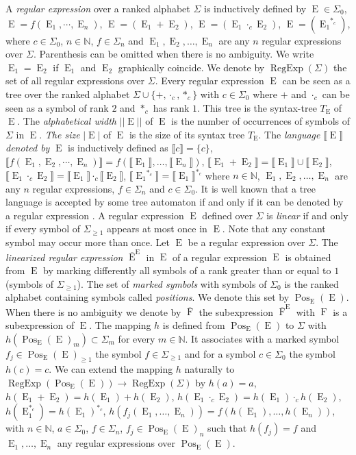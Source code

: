 \documentclass{llncs}
\def\Po#1#2{\Pos_{#1}{(#2)}}
\def\regw#1{\Reg{(#1)}}
\DeclareMathOperator{\Reg}{RegExp}
\DeclareMathOperator{\E}{E}
\DeclareMathOperator{\f}{F}
\DeclareMathOperator{\Pos}{Pos}
\def\b#1{\overline{#1}}
\begin{document}
A \emph{regular expression} over a ranked alphabet $\Sigma$ is inductively defined by $\E\in \Sigma_0$, $\E=f(\E_1, \cdots, \E_n)$, $\E=(\E_1+\E_2)$, $\E=(\E_1\cdot_c \E_2)$, $\E=({\E_1}^{*_c})$, where $c\in\Sigma_0$, $n\in\mathbb{N}$, $f\in\Sigma_n$ and $\E_1,\E_2 ,\dots, \E_n$ are any $n$ regular expressions over $\Sigma$. Parenthesis can be omitted when there is no ambiguity. We write $\E_1=\E_2$ if $\E_1$ and $\E_2$ graphically coincide. We denote by $\regw{\Sigma}$ the set of all regular expressions over $\Sigma$. Every regular expression $\E$ can be seen as a tree over the ranked alphabet $\Sigma\cup \{+,\cdot_c, *_c \}$ with $c\in \Sigma_0$ where $+$ and $\cdot_c$ can be seen as a symbol of rank $2$ and $*_c$ has rank $1$. This tree is the syntax-tree $T_{\E}$ of $\E$. The \emph{alphabetical width} $||\E||$ of $\E$ is the number of occurrences of symbols of $\Sigma$ in $\E$. \emph{The size} $|\E|$ of $\E$ is the size of its syntax tree $T_{\E}$. The \emph{language} $\llbracket \E\rrbracket$  \emph{
denoted by} $\E$ is inductively defined as $\llbracket c\rrbracket=\lbrace c\rbrace$, $\llbracket f(\E_1,\E_2 , \cdots, \E_n)\rrbracket= f(\llbracket \E_1 \rrbracket, \dots, \llbracket \E_n \rrbracket)$, $\llbracket \E_1+ \E_2\rrbracket=\llbracket \E_1\rrbracket\cup\llbracket \E_2 \rrbracket$, $\llbracket \E_1\cdot_{c} \E_2\rrbracket=\llbracket \E_1\rrbracket \cdot_{c}\llbracket \E_2 \rrbracket$, $\llbracket {\E_1}^{*_c}\rrbracket=\llbracket \E_1\rrbracket^{*_c}$ where  $n\in\mathbb{N}$, $\E_1,\E_2,\dots, \E_n$ are any $n$ regular expressions, $f\in\Sigma_n$  and $c\in \Sigma_0$. It is well known that a tree language  is accepted by some tree automaton if and only if it can be denoted by a regular expression \cite{automate1,automate2}.
A regular expression $\E$ defined over $\Sigma$ is  \emph{linear} if and only if every symbol of $\Sigma_{\geq 1}$ appears at most once in $\E$. Note that any constant symbol may occur more than once. Let $\E$ be a regular expression over $\Sigma$. The  \emph{linearized regular expression} $\b\E^{\E}$ in $\E$ of a regular expression $\E$ is obtained from $\E$ by marking differently all symbols of a rank  greater than or equal to $1$ (symbols of $\Sigma_{\geq 1}$). The set of  \emph{marked symbols} with symbols of $\Sigma_0$ is the ranked alphabet  containing symbols called  \emph{positions}. We denote this set by $\Po{\E}{\E}$. When there is no ambiguity we denote by $\b{\f}$ the subexpression $\b{\f}^{\E}$ with $\f$ is a subexpression  of $\E$.
The mapping $h$ is defined from $\Po{\E}{\E}$ to $\Sigma$ with $h(\Po{\E}{\E}_m)\subset \Sigma_m$ for every  $m\in \mathbb{N}$. It associates with a marked symbol $f_j\in  \Po{\E}{\E}_{\geq 1}$ the symbol $f\in \Sigma_{\geq 1}$ and for a symbol $c\in \Sigma_0$ the symbol $h(c)=c$.
We can extend the mapping $h$ naturally to  $\regw{\Po{\E}{\E}}\rightarrow\regw{\Sigma}$ by $h(a)=a$, $h(\E_1+\E_2)=h(\E_1)+h(\E_2)$, $h(\E_1\cdot_c\E_2)=h(\E_1)\cdot_c h(\E_2)$, $h(\E_1^{*_c})=h(\E_1)^{*_c}$, $h(f_j(\E_1,\dots,\E_n))=f(h(\E_1),\dots,h(\E_n))$, with $n\in\mathbb{N}$, $a\in \Sigma_0$, $f\in \Sigma_n$, $f_j\in \Po{\E}{\E}_n$ such that $h(f_j)=f$ and $\E_1,\dots,\E_n$ any regular expressions over $\Po{\E}{\E}$.
\end{document}
